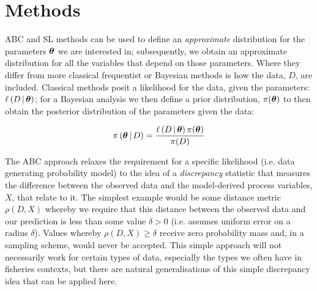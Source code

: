 \documentclass[11pt]{article}
\newcommand{\xtheta}{\mbox{\boldmath$\theta$}}
\begin{document}
\section{Methods}

ABC \cite{abc} and SL \cite{synlkhd} methods can be used to define an \emph{approximate} distribution for the parameters $\xtheta$ we are interested in; subsequently, we obtain an approximate distribution for all the variables that depend on those parameters. Where they differ from more classical frequentist or Bayesian methods is how the data, $D$, are included. Classical methods posit a likelihood for the data, given the parameters: $\ell\left(D\,|\,\xtheta\right)$; for a Bayesian analysis we then define a prior distribution, $\pi(\xtheta)$ to then obtain the posterior distribution of the parameters given the data:

\begin{equation*}
  \pi\left(\xtheta\,|\,D\right) = \frac{\ell\left(D\,|\,\xtheta\right)\pi(\xtheta)}{\pi(D)}
\end{equation*}

The ABC approach relaxes the requirement for a specific likelihood (i.e. data generating probability model) to the idea of a \emph{discrepancy} statistic that measures the difference between the observed data and the model-derived process variables, $X$, that relate to it. The simplest example would be some distance metric $\rho(D,X)$ whereby we require that this distance between the observed data and our prediction is less than some value $\delta>0$ (i.e. assumes uniform error on a radius $\delta$). Values whereby $\rho(D,X)\geq\delta$ receive zero probability mass and, in a sampling scheme, would never be accepted. This simple approach will not necessarily work for certain types of data, especially the types we often have in fisheries contexts, but there are natural generalisations of this simple discrepancy idea that can be applied here.
\end{document}
